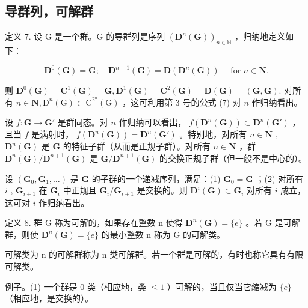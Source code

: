 \subsection{导群列，可解群}

定义 7. 设 G 是一个群。G 的导群列是序列 \((\mathbf{D}^n (\mathbf{G}))_{n\in \mathbb{N}}\) ，归纳地定义如下：

\[
\mathbf {D} ^ {0} (\mathbf {G}) = \mathbf {G}; \quad \mathbf {D} ^ {n + 1} (\mathbf {G}) = \mathbf {D} (\mathbf {D} ^ {n} (\mathbf {G})) \quad \text { for } n \in \mathbf {N}.
\]

则 \(\mathbf{D}^0 (\mathbf{G}) = \mathbf{C}^1 (\mathbf{G}) = \mathbf{G},\mathbf{D}^1 (\mathbf{G}) = \mathbf{C}^2 (\mathbf{G}) = \mathbf{D}(\mathbf{G}) = (\mathbf{G},\mathbf{G}).\) 对所有 \(n \in \mathbf{N}, \mathrm{D}^n(\mathrm{G}) \subset \mathrm{C}^{2^n}(\mathrm{G})\) ，这可利用第 3 号的公式 (7) 对 \(n\) 作归纳看出。

设 \(f: \mathbf{G} \to \mathbf{G}'\) 是群同态。对 \(n\) 作归纳可以看出， \(f(\mathbf{D}^n(\mathbf{G})) \subset \mathbf{D}^n(\mathbf{G}')\) ，且当 \(f\) 是满射时， \(f(\mathbf{D}^n(\mathbf{G})) = \mathbf{D}^n(\mathbf{G}')\) 。特别地，对所有 \(n \in \mathbf{N}\) , \(\mathbf{D}^n(\mathbf{G})\) 是 \(\mathbf{G}\) 的特征子群（从而是正规子群）。对所有 \(n \in \mathbf{N}\) ，群 \(\mathbf{D}^n(\mathbf{G}) / \mathbf{D}^{n+1}(\mathbf{G})\) 是 \(\mathbf{G} / \mathbf{D}^{n+1}(\mathbf{G})\) 的交换正规子群（但一般不是中心的）。

设 \((\mathbf{G}_0, \mathbf{G}_1, \ldots)\) 是 \(\mathbf{G}\) 的子群的一个递减序列，满足：(1) \(\mathbf{G}_0 = \mathbf{G}\) ；(2) 对所有 \(i\) , \(\mathbf{G}_{i+1}\) 在 \(\mathbf{G}_i\) 中正规且 \(\mathbf{G}_i / \mathbf{G}_{i+1}\) 是交换的。则 \(\mathbf{D}^i(\mathbf{G}) \subset \mathbf{G}_i\) 对所有 \(i\) 成立，这可对 \(i\) 作归纳看出。

定义 8. 群 G 称为可解的，如果存在整数 n 使得 \(\mathbf{D}^{n}(\mathbf{G})=\{e\}\) 。若 G 是可解群，则使 \(\mathbf{D}^{n}(\mathbf{G})=\{e\}\) 的最小整数 n 称为 G 的可解类。

可解类为 n 的可解群称为 n 类可解群。若一个群是可解的，有时也称它具有有限可解类。

例子。(1) 一个群是 0 类（相应地，类 \(\leqslant 1\) ）可解的，当且仅当它缩减为 \(\{e\}\) （相应地，是交换的）。

